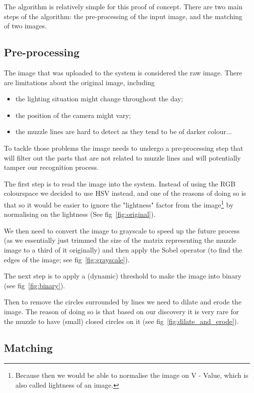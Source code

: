 The algorithm is relatively simple for this proof of concept. There are two main steps of the algorithm: the pre-processing of the input image, and the matching of two images.

\subsection{Pre-processing}

The image that was uploaded to the system is considered the raw image. There are limitations about the original image, including

\begin{itemize}
	\item the lighting situation might change throughout the day;
	\item the position of the camera might vary;
	\item the muzzle lines are hard to detect as they tend to be of darker colour...
\end{itemize}

To tackle those problems the image needs to undergo a pre-processing step that will filter out the parts that are not related to muzzle lines and will potentially tamper our recognition process.

The first step is to read the image into the system. Instead of using the RGB colourspace we decided to use HSV instead, and one of the reasons of doing so is that so it would be easier to ignore the "lightness" factor from the image\footnote{Because then we would be able to normalise the image on V - Value, which is also called lightness of an image.} by normalising on the lightness (See fig~\ref{fig:original}).

We then need to convert the image to grayscale to speed up the future process (as we essentially just trimmed the size of the matrix representing the muzzle image to a third of it originally) and then apply the Sobel operator (to find the edges of the image; see fig~\ref{fig:grayscale}).

The next step is to apply a (dynamic) threshold to make the image into binary (see fig~\ref{fig:binary}).

Then to remove the circles surrounded by lines we need to dilate and erode the image. The reason of doing so is that based on our discovery it is very rare for the muzzle to have (small) closed circles on it (see fig~\ref{fig:dilate_and_erode}).

\subsection{Matching}

